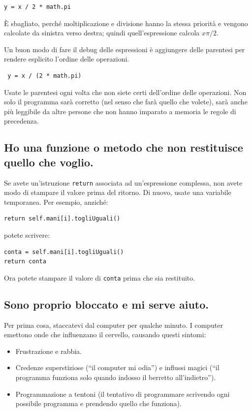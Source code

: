 \documentclass[10pt]{book}
\begin{document}
\begin{verbatim}
y = x / 2 * math.pi
\end{verbatim}
%
È sbagliato, perché moltiplicazione e divisione hanno la stessa priorità e vengono calcolate da sinistra verso destra; quindi quell'espressione calcola $x \pi / 2$.

Un buon modo di fare il debug delle espressioni è aggiungere delle parentesi per rendere esplicito l'ordine delle operazioni.

\begin{verbatim}
 y = x / (2 * math.pi)
\end{verbatim}
%
Usate le parentesi ogni volta che non siete certi dell'ordine delle operazioni. Non solo il programma sarà corretto (nel senso che farà quello che volete), sarà anche più leggibile da altre persone che non hanno imparato a memoria le regole di precedenza.


\subsection{Ho una funzione o metodo che non restituisce quello che voglio.}

Se avete un'istruzione {\tt return} associata ad un'espressione complessa, non avete modo di stampare il valore prima del ritorno. Di nuovo, usate una variabile temporanea. Per esempio, anziché:

\begin{verbatim}
return self.mani[i].togliUguali()
\end{verbatim}
%
potete scrivere:

\begin{verbatim}
conta = self.mani[i].togliUguali()
return conta
\end{verbatim}
%
Ora potete stampare il valore di {\tt conta} prima che sia restituito.


\subsection{Sono proprio bloccato e mi serve aiuto.}

Per prima cosa, staccatevi dal computer per qualche minuto. I computer emettono onde che influenzano il cervello, causando questi sintomi:

\begin{itemize}

\item Frustrazione e rabbia.

\item Credenze superstiziose (``il computer mi odia'') e influssi magici (``il programma funziona solo quando indosso il berretto all'indietro'').


\item Programmazione a tentoni (il tentativo di programmare scrivendo ogni possibile programma e prendendo quello che funziona).

\end{itemize}
\end{document}
